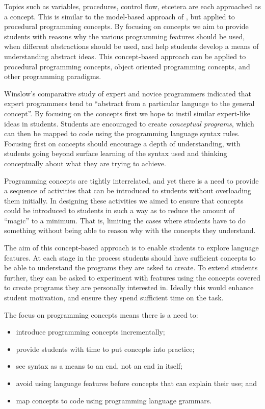 Topics such as variables, procedures, control flow, etcetera are each approached as a concept. This is similar to the model-based approach of \citet{Bennedsen:2004}, but applied to procedural programming concepts. By focusing on concepts we aim to provide students with reasons why the various programming features should be used, when different abstractions should be used, and help students develop a means of understanding abstract ideas. This concept-based approach can be applied to procedural programming concepts, object oriented programming concepts, and other programming paradigms.

Winslow's comparative study of expert and novice programmers \cite{Winslow:1996} indicated that expert programmers tend to ``abstract from a particular language to the general concept''. By focusing on the concepts first we hope to instil similar expert-like ideas in students. Students are encouraged to create \emph{conceptual programs}, which can then be mapped to code using the programming language syntax rules. Focusing first on concepts should encourage a depth of understanding, with students going beyond surface learning of the syntax used and thinking conceptually about what they are trying to achieve.

Programming concepts are tightly interrelated, and yet there is a need to provide a sequence of activities that can be introduced to students without overloading them initially. In designing these activities we aimed to ensure that concepts could be introduced to students in such a way as to reduce the amount of ``magic'' to a minimum. That is, limiting the cases where students have to do something without being able to reason why with the concepts they understand.

The aim of this concept-based approach is to enable students to explore language features. At each stage in the process students should have sufficient concepts to be able to understand the programs they are asked to create. To extend students further, they can be asked to experiment with features using the concepts covered to create programs they are personally interested in. Ideally this would enhance student motivation, and ensure they spend sufficient time on the task.

The focus on programming concepts means there is a need to: %
\begin{itemize}[noitemsep,nolistsep]
	\item introduce programming concepts incrementally;
	\item provide students with time to put concepts into practice;
	\item see syntax as a means to an end, not an end in itself;
	\item avoid using language features before concepts that can explain their use; and
	\item map concepts to code using programming language grammars.
\end{itemize} 

